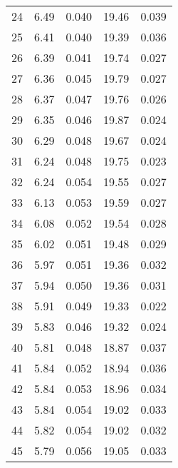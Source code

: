 \begin{table}
\begin{tabular}{c|ll|ll}
24 & 6.49 & 0.040 & 19.46 & 0.039 \\
25 & 6.41 & 0.040 & 19.39 & 0.036 \\
26 & 6.39 & 0.041 & 19.74 & 0.027 \\
27 & 6.36 & 0.045 & 19.79 & 0.027 \\
28 & 6.37 & 0.047 & 19.76 & 0.026 \\
29 & 6.35 & 0.046 & 19.87 & 0.024 \\
30 & 6.29 & 0.048 & 19.67 & 0.024 \\
31 & 6.24 & 0.048 & 19.75 & 0.023 \\
32 & 6.24 & 0.054 & 19.55 & 0.027 \\
33 & 6.13 & 0.053 & 19.59 & 0.027 \\
34 & 6.08 & 0.052 & 19.54 & 0.028 \\
35 & 6.02 & 0.051 & 19.48 & 0.029 \\
36 & 5.97 & 0.051 & 19.36 & 0.032 \\
37 & 5.94 & 0.050 & 19.36 & 0.031 \\
38 & 5.91 & 0.049 & 19.33 & 0.022 \\
39 & 5.83 & 0.046 & 19.32 & 0.024 \\
40 & 5.81 & 0.048 & 18.87 & 0.037 \\
41 & 5.84 & 0.052 & 18.94 & 0.036 \\
42 & 5.84 & 0.053 & 18.96 & 0.034 \\
43 & 5.84 & 0.054 & 19.02 & 0.033 \\
44 & 5.82 & 0.054 & 19.02 & 0.032 \\
45 & 5.79 & 0.056 & 19.05 & 0.033 \\
               \hline
        \end{tabular}
    \end{table}
    \clearpage

